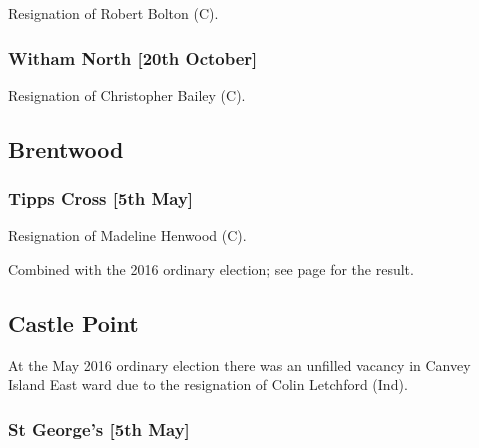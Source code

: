 \documentclass[a4paper,openany]{book}
\begin{document}
\begin{resultsiii}

Resignation of Robert Bolton (C).

\subsubsection*{Witham North \hspace*{\fill}\nolinebreak[1]%
\enspace\hspace*{\fill}
[20th October]}


Resignation of Christopher Bailey (C).

\subsection*{Brentwood}

\subsubsection*{Tipps Cross \hspace*{\fill}\nolinebreak[1]%
\enspace\hspace*{\fill}
[5th May]}


Resignation of Madeline Henwood (C).

Combined with the 2016 ordinary election; see page \pageref{TippsCrossBrentwood} for the result.

\subsection*{Castle Point}

At the May 2016 ordinary election there was an unfilled vacancy in Canvey Island East ward due to the resignation of Colin Letchford (Ind).

\subsubsection*{St George's \hspace*{\fill}\nolinebreak[1]%
\enspace\hspace*{\fill}
[5th May]}



\end{resultsiii}
\end{document}
